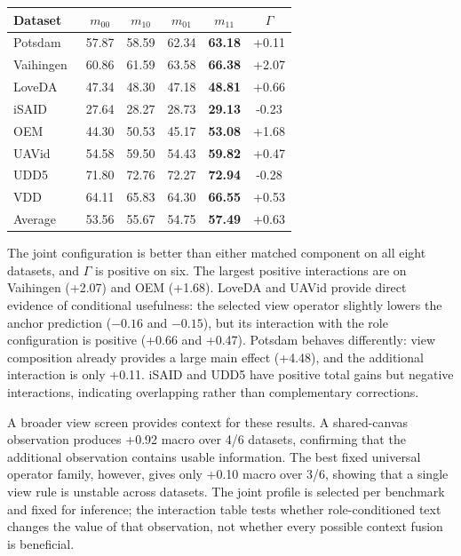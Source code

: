 \begin{center}
\centering
\captionsetup{hypcap=false}
\label{tab:interaction}
\captionsetup{hypcap=true}
\small
\setlength{\tabcolsep}{3.5pt}
\begin{tabular}{lccccc}
\toprule
Dataset & $m_{00}$ & $m_{10}$ & $m_{01}$ & $m_{11}$ & $\Gamma$ \\
\midrule
Potsdam~\cite{R42} & 57.87 & 58.59 & 62.34 & \textbf{63.18} & +0.11 \\
Vaihingen~\cite{R42} & 60.86 & 61.59 & 63.58 & \textbf{66.38} & +2.07 \\
LoveDA~\cite{R36} & 47.34 & 48.30 & 47.18 & \textbf{48.81} & +0.66 \\
iSAID~\cite{R37} & 27.64 & 28.27 & 28.73 & \textbf{29.13} & -0.23 \\
OEM~\cite{R38} & 44.30 & 50.53 & 45.17 & \textbf{53.08} & +1.68 \\
UAVid~\cite{R39} & 54.58 & 59.50 & 54.43 & \textbf{59.82} & +0.47 \\
UDD5~\cite{R40} & 71.80 & 72.76 & 72.27 & \textbf{72.94} & -0.28 \\
VDD~\cite{R41} & 64.11 & 65.83 & 64.30 & \textbf{66.55} & +0.53 \\
\midrule
Average & 53.56 & 55.67 & 54.75 & \textbf{57.49} & +0.63 \\
\bottomrule
\end{tabular}
\end{center}

The joint configuration is better than either matched component on all eight datasets, and $\Gamma$ is positive on six. The largest positive interactions are on Vaihingen (+2.07) and OEM (+1.68). LoveDA and UAVid provide direct evidence of conditional usefulness: the selected view operator slightly lowers the anchor prediction ($-0.16$ and $-0.15$), but its interaction with the role configuration is positive (+0.66 and +0.47). Potsdam behaves differently: view composition already provides a large main effect (+4.48), and the additional interaction is only +0.11. iSAID and UDD5 have positive total gains but negative interactions, indicating overlapping rather than complementary corrections.

A broader view screen provides context for these results. A shared-canvas observation produces +0.92 macro over 4/6 datasets, confirming that the additional observation contains usable information. The best fixed universal operator family, however, gives only +0.10 macro over 3/6, showing that a single view rule is unstable across datasets. The joint profile is selected per benchmark and fixed for inference; the interaction table tests whether role-conditioned text changes the value of that observation, not whether every possible context fusion is beneficial.

